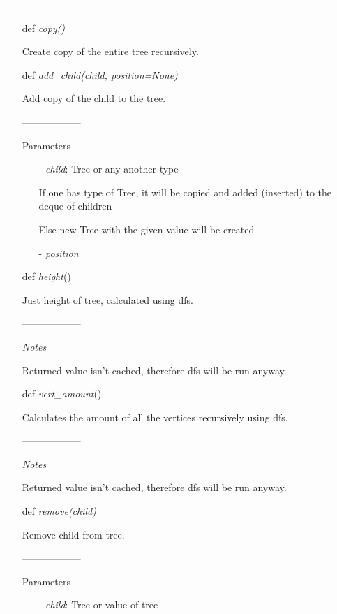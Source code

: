 \documentclass[a4paper,12pt]{amsart}
\begin{document}
\begin{itemize}
\begin{itemize}
	\end{itemize}

	-----------------------

	\begin{itemize}
		\item[def] \textit{copy()}
		
		Create copy of the entire tree recursively.
		
		\item[def] \textit{add\_child(child, position=None)}
		
		Add copy of the child to the tree.
		
		------------------
		
		Parameters
		
		\begin{itemize}
			\item[-] \textit{child}: Tree or any another type

			If one has type of Tree, it will be copied and
			added (inserted) to the deque of children
			
			Else new Tree with the given value will be created
			
			\item[-] \textit{position}
		\end{itemize}
	
		
		\item[def] \textit{height}()
		
		Just height of tree, calculated using dfs.
		
		------------------
		
		\textit{Notes}

		Returned value isn't cached, therefore dfs will be run anyway.
		
		
		\item[def] \textit{vert\_amount}()
		
		Calculates the amount of all the vertices recursively
		using dfs.
		
		------------------
		
		\textit{Notes}
		
		Returned value isn't cached, therefore dfs will be run anyway.
		
		
		\item[def] \textit{remove(child)}
		
		Remove child from tree.
		
		------------------
		
		Parameters
		
		\begin{itemize}
			\item[-] \textit{child}: Tree or value of tree
		\end{itemize}
		

\end{itemize}
\end{itemize}
\end{document}
